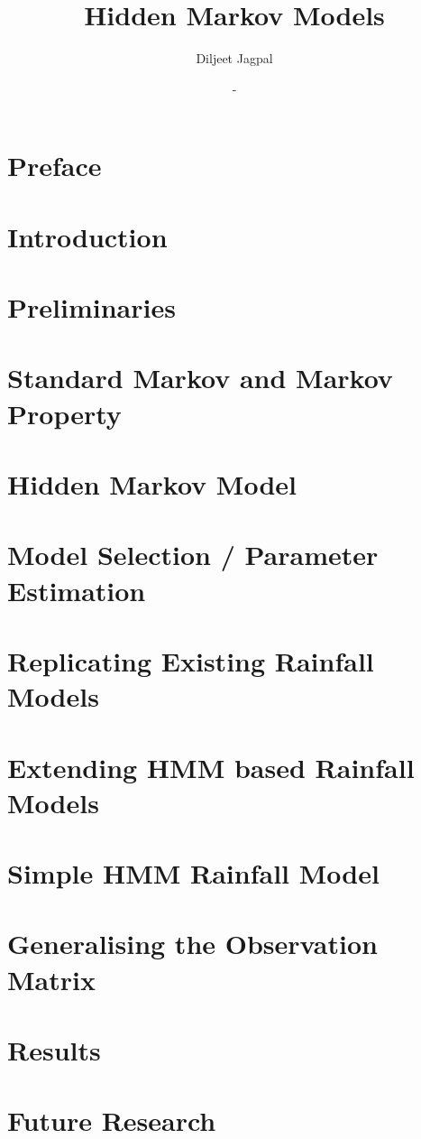 \documentclass[a4paper,12pt]{report}
\title{\Huge Hidden Markov Models}
\author{Diljeet Jagpal}
\date{-}
\theoremstyle{plain}
\begin{document}
	\maketitle
	\tableofcontents

	\chapter*{Preface}
	

	\newpage

	\chapter{Introduction}
	
	\newpage

	\chapter{Preliminaries}
	
	\newpage

	\chapter{Standard Markov and Markov Property}
	
	\newpage

	\chapter{Hidden Markov Model}
	\label{chp4}
	
	\newpage

	\chapter{Model Selection  / Parameter Estimation}
	
	\newpage

	\chapter{Replicating Existing Rainfall Models}
	
	\newpage

	\chapter{Extending HMM based Rainfall Models}
	
	\newpage

	\chapter{Simple HMM Rainfall Model}
	
	\newpage

	\chapter{Generalising the Observation Matrix}
	
	\newpage

	\chapter{Results}
	
	\newpage

	\chapter{Future Research}
	
	\newpage

	\nocite{*}
	\printbibliography
\end{document}
